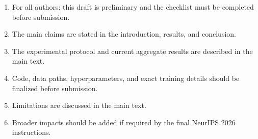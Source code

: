 \begin{enumerate}
    \item For all authors: this draft is preliminary and the checklist must be completed before submission.
    \item The main claims are stated in the introduction, results, and conclusion.
    \item The experimental protocol and current aggregate results are described in the main text.
    \item Code, data paths, hyperparameters, and exact training details should be finalized before submission.
    \item Limitations are discussed in the main text.
    \item Broader impacts should be added if required by the final NeurIPS 2026 instructions.
\end{enumerate}
